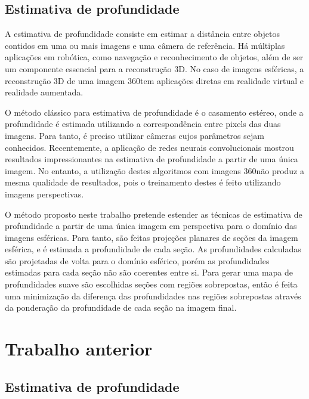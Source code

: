 \documentclass[cic,tc]{iiufrgs}
\begin{document}
\section{Estimativa de profundidade}

A estimativa de profundidade consiste em estimar
a distância entre objetos contidos em uma ou mais imagens e uma câmera de referência. Há múltiplas aplicações em robótica, como navegação e reconhecimento de objetos, além de ser um componente essencial para a reconstrução 3D. No caso de imagens esféricas, a reconstrução 3D de uma imagem 360\degree tem aplicações diretas em realidade virtual e realidade aumentada.

O método clássico para estimativa de profundidade é o casamento estéreo, onde a profundidade é estimada utilizando a correspondência entre pixels das duas imagens. Para tanto, é preciso utilizar câmeras cujos parâmetros sejam conhecidos. Recentemente, a aplicação de redes neurais convolucionais mostrou resultados impressionantes na estimativa de profundidade a partir de uma única imagem. No entanto, a utilização destes algoritmos com imagens 360\degree não produz a mesma qualidade de resultados, pois o treinamento destes é feito utilizando imagens perspectivas. 

O método proposto neste trabalho pretende estender as técnicas de estimativa de profundidade a partir de uma única imagem em perspectiva para o domínio das imagens esféricas. Para tanto, são feitas projeções planares de seções da imagem esférica, e é estimada a profundidade de cada seção. As profundidades calculadas são projetadas de volta para o domínio esférico, porém as profundidades estimadas para cada seção não são coerentes entre si.
Para gerar uma mapa de profundidades suave são escolhidas seções com regiões sobrepostas, então é feita uma minimização da diferença das profundidades nas regiões sobrepostas através da ponderação da profundidade de cada seção na imagem final.


\chapter{Trabalho anterior}

\section{Estimativa de profundidade}
\end{document}
